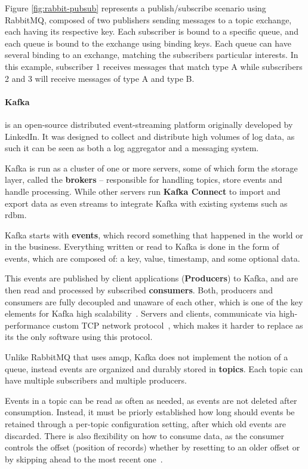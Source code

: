 Figure \ref{fig:rabbit-pubsub} represents a publish/subscribe scenario using RabbitMQ, composed of two publishers sending messages to a topic exchange, each having its respective key. Each subscriber is bound to a specific queue, and each queue is bound to the exchange using binding keys. Each queue can have several binding to an exchange, matching the subscribers particular interests. In this example, subscriber 1 receives messages that match type A while subscribers 2 and 3 will receive messages of type A and type B. 

\paragraph{\textbf{Kafka}} is an open-source distributed \gls{event-streaming} platform originally developed by LinkedIn. It was designed to collect and distribute high volumes of log data, as such it can be seen as both a log aggregator and a messaging system. 

Kafka is run as a cluster of one or more servers, some of which form the storage layer, called the \textbf{brokers} -- responsible for handling topics, store events and handle processing. While other servers run \textbf{Kafka Connect} to import and export data as even streams to integrate Kafka with existing systems such as \acrfull{rdbm}. 

Kafka starts with \textbf{events}, which record something that happened in the world or in the business. Everything written or read to Kafka is done in the form of events, which are composed of: a key, value, timestamp, and some optional data.

This events are published by client applications (\textbf{Producers}) to Kafka, and are then read and processed by subscribed \textbf{consumers}. Both, producers and consumers are fully decoupled and unaware of each other, which is one of the key elements for Kafka high scalability~\cite{6228206}. Servers and clients, communicate via high-performance custom TCP network protocol~\cite{custom-kafka-tcp-protocol}, which makes it harder to replace as its the only software using this protocol.

Unlike RabbitMQ that uses \acrshort{amqp}, Kafka does not implement the notion of a queue, instead events are organized and durably stored in \textbf{topics}. Each topic can have multiple subscribers and multiple producers. 

Events in a topic can be read as often as needed, as events are not deleted after consumption. Instead, it must be priorly established how long should events be retained through a per-topic configuration setting, after which old events are discarded. There is also flexibility on how to consume data, as the consumer controls the offset (position of records) whether by resetting to an older offset or by skipping ahead to the most recent one~\cite{10.1145/3242153.3242155}.  

